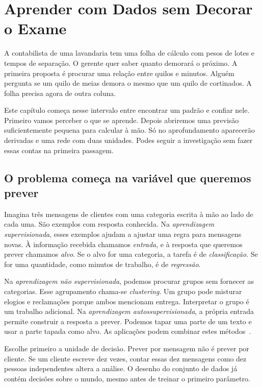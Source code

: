 \chapter{Aprender com Dados sem Decorar o Exame}
\label{ch:ml}

\ficcao A contabilista de uma lavandaria tem uma folha de cálculo com pesos de lotes e tempos de separação. O gerente quer saber quanto demorará o próximo. A primeira proposta é procurar uma relação entre quilos e minutos. Alguém pergunta se um quilo de meias demora o mesmo que um quilo de cortinados. A folha precisa agora de outra coluna.

Este capítulo começa nesse intervalo entre encontrar um padrão e confiar nele. Primeiro vamos perceber o que se aprende. Depois abriremos uma previsão suficientemente pequena para calcular à mão. Só no aprofundamento aparecerão derivadas e uma rede com duas unidades. Podes seguir a investigação sem fazer essas contas na primeira passagem.

\section{O problema começa na variável que queremos prever}
Imagina três mensagens de clientes com uma categoria escrita à mão ao lado de cada uma. São exemplos com resposta conhecida. Na \emph{aprendizagem supervisionada}, esses exemplos ajudam a ajustar uma regra para mensagens novas. À informação recebida chamamos \emph{entrada}, e à resposta que queremos prever chamamos \emph{alvo}. Se o alvo for uma categoria, a tarefa é de \emph{classificação}. Se for uma quantidade, como minutos de trabalho, é de \emph{regressão}.

Na \emph{aprendizagem não supervisionada}, podemos procurar grupos sem fornecer as categorias. Esse agrupamento chama-se \emph{clustering}. Um grupo pode misturar elogios e reclamações porque ambos mencionam entrega. Interpretar o grupo é um trabalho adicional. Na \emph{aprendizagem autossupervisionada}, a própria entrada permite construir a resposta a prever. Podemos tapar uma parte de um texto e usar a parte tapada como alvo. As aplicações podem combinar estes métodos~\citep{goodfellow2016}.

Escolhe primeiro a unidade de decisão. Prever por mensagem não é prever por cliente. Se um cliente escreve dez vezes, contar essas dez mensagens como dez pessoas independentes altera a análise. O desenho do conjunto de dados já contém decisões sobre o mundo, mesmo antes de treinar o primeiro parâmetro.

